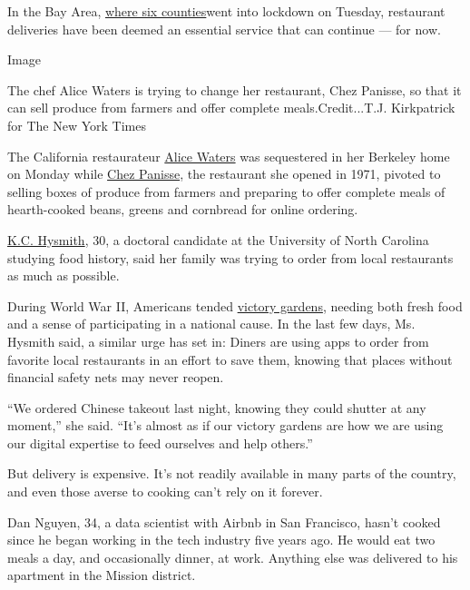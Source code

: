 In the Bay Area,
\href{https://www.nytimes3xbfgragh.onion/reuters/2020/03/16/us/16reuters-health-coronavirus-usa-sfarea-factbox.html}{where
six counties}went into lockdown on Tuesday, restaurant deliveries have
been deemed an essential service that can continue --- for now.

Image

The chef Alice Waters is trying to change her restaurant, Chez Panisse,
so that it can sell produce from farmers and offer complete
meals.Credit...T.J. Kirkpatrick for The New York Times

The California restaurateur
\href{https://www.nytimes3xbfgragh.onion/2017/08/22/dining/alice-waters-chef-author-book.html}{Alice
Waters} was sequestered in her Berkeley home on Monday while
\href{https://www.chezpanisse.com/reservations/}{Chez Panisse}, the
restaurant she opened in 1971, pivoted to selling boxes of produce from
farmers and preparing to offer complete meals of hearth-cooked beans,
greens and cornbread for online ordering.

\href{https://www.kchysmith.com/}{K.C. Hysmith}, 30, a doctoral
candidate at the University of North Carolina studying food history,
said her family was trying to order from local restaurants as much as
possible.

During World War II, Americans tended
\href{https://www.nytimes3xbfgragh.onion/1943/09/19/archives/first-year-is-hardest-despite-mistakes-victory-gardens-have-done.html}{victory
gardens}, needing both fresh food and a sense of participating in a
national cause. In the last few days, Ms. Hysmith said, a similar urge
has set in: Diners are using apps to order from favorite local
restaurants in an effort to save them, knowing that places without
financial safety nets may never reopen.

``We ordered Chinese takeout last night, knowing they could shutter at
any moment,'' she said. ``It's almost as if our victory gardens are how
we are using our digital expertise to feed ourselves and help others.''

But delivery is expensive. It's not readily available in many parts of
the country, and even those averse to cooking can't rely on it forever.

Dan Nguyen, 34, a data scientist with Airbnb in San Francisco, hasn't
cooked since he began working in the tech industry five years ago. He
would eat two meals a day, and occasionally dinner, at work. Anything
else was delivered to his apartment in the Mission district.

